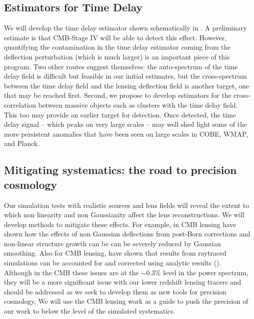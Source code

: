 \subsection{Estimators for Time Delay}

We will develop the time delay estimator shown schematically in . A preliminary estimate is that CMB-Stage IV will be able to detect this effect. However, quantifying the contamination in the time delay estimator coming from the deflection perturbation (which is much larger) is an important piece of this program. Two other routes suggest themselves: the auto-spectrum of the time delay field is difficult but feasible in our initial estimates, but the cross-spectrum between the time delay field and the lensing deflection field is another target, one that may be reached first. Second, we propose to develop estimators for the cross-correlation between massive objects such as clusters with the time delay field. This too may provide an earlier target for detection. Once detected, the time delay signal -- which peaks on very large scales -- may well shed light some of the more persistent anomalies that have been seen on large scales in COBE, WMAP, and Planck.

\subsection{Mitigating systematics: the road to precision cosmology}

Our simulation tests with realistic sources and lens fields will
reveal the extent to which non linearity and non Gaussianity affect
the lens reconstructions. We will  develop methods to mitigate
these effects. For example, in CMB lensing \cite{lewis16} have shown
how the effects of non Gaussian deflections from post-Born corrections
and non-linear structure growth can be can be severely reduced by
Gaussian smoothing. Also for CMB lensing, \cite{bohm18} have shown
that results from raytraced simulations can be accounted for and
corrected using analytic results (\cite{bohm16}). Although in the CMB
these issues are at the $\sim0.3 \%$ level in the power spectrum, they
will be a more significant issue with our lower redshift lensing
tracers and should be addressed as we seek to develop them as new
tools for precision cosmology. We will use the CMB lensing work as a
guide to push the precision of our work to below the level of the
simulated systematics.

